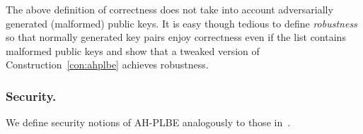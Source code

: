 \noindent
The above definition of correctness does not take into account
adversarially generated (malformed) public keys.
It is easy though tedious
to define \emph{robustness} so that normally generated key pairs enjoy correctness even if the list contains malformed public keys
and show that a tweaked version of Construction~\ref{con:ahplbe} achieves robustness.

\subsubsection{Security.}
We define security notions of AH-PLBE analogously to those in~\cite{EC:BonSahWat06}.
